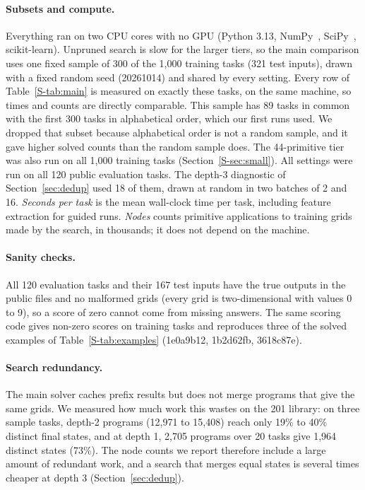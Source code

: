 \documentclass[sigconf,nonacm]{acmart}
\begin{document}
\paragraph{Subsets and compute.}\label{sec:setup-note} Everything ran on two CPU cores with no GPU (Python 3.13, NumPy~\cite{harris2020numpy}, SciPy~\cite{virtanen2020scipy}, scikit-learn). Unpruned search is slow for the larger tiers, so the main comparison uses one fixed sample of 300 of the 1{,}000 training tasks (321 test inputs), drawn with a fixed random seed (20261014) and shared by every setting. Every row of Table~\ref{S-tab:main} is measured on exactly these tasks, on the same machine, so times and counts are directly comparable. This sample has 89 tasks in common with the first 300 tasks in alphabetical order, which our first runs used. We dropped that subset because alphabetical order is not a random sample, and it gave higher solved counts than the random sample does. The 44-primitive tier was also run on all 1{,}000 training tasks (Section~\ref{S-sec:small}). All settings were run on all 120 public evaluation tasks. The depth-3 diagnostic of Section~\ref{sec:dedup} used 18 of them, drawn at random in two batches of 2 and 16. \emph{Seconds per task} is the mean wall-clock time per task, including feature extraction for guided runs. \emph{Nodes} counts primitive applications to training grids made by the search, in thousands; it does not depend on the machine.

\paragraph{Sanity checks.} All 120 evaluation tasks and their 167 test inputs have the true outputs in the public files and no malformed grids (every grid is two-dimensional with values 0 to 9), so a score of zero cannot come from missing answers. The same scoring code gives non-zero scores on training tasks and reproduces three of the solved examples of Table~\ref{S-tab:examples} (1e0a9b12, 1b2d62fb, 3618c87e).

\paragraph{Search redundancy.} The main solver caches prefix results but does not merge programs that give the same grids. We measured how much work this wastes on the 201 library: on three sample tasks, depth-2 programs (12{,}971 to 15{,}408) reach only 19\% to 40\% distinct final states, and at depth 1, 2{,}705 programs over 20 tasks give 1{,}964 distinct states (73\%). The node counts we report therefore include a large amount of redundant work, and a search that merges equal states is several times cheaper at depth 3 (Section~\ref{sec:dedup}).
\end{document}

